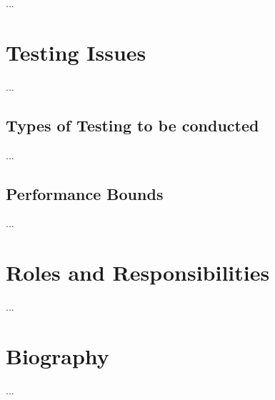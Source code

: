 \documentclass[11pt,a4paper,titlepage]{report}
\begin{document}
...


\section{Testing Issues}

...

\subsection{Types of Testing to be conducted}

...

\subsection{Performance Bounds}

...




\section{Roles and Responsibilities}

...

\section{Biography}

...
\end{document}
